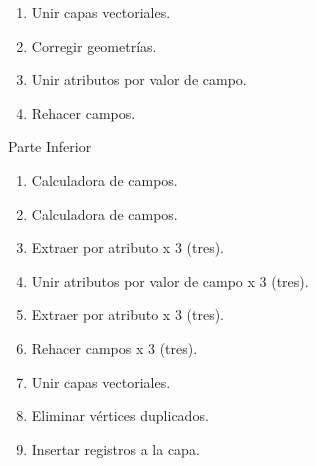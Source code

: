 \documentclass[letterpaper,10pt,spanish]{sphinxmanual}
\begin{document}
\begin{sphinxVerbatim}[commandchars=\\\{\}]
   
\end{sphinxVerbatim}
\begin{enumerate}
%
\item {} 
Unir capas vectoriales.

\item {} 
Corregir geometrías.

\item {} 
Unir atributos por valor de campo.

\item {} 
Rehacer campos.

\end{enumerate}

Parte Inferior
\begin{enumerate}
%
\item {} 
Calculadora de campos.

\item {} 
Calculadora de campos.

\item {} 
Extraer por atributo x 3 (tres).

\item {} 
Unir atributos por valor de campo x 3 (tres).

\item {} 
Extraer por atributo x 3 (tres).

\item {} 
Rehacer campos x 3 (tres).

\item {} 
Unir capas vectoriales.

\item {} 
Eliminar vértices duplicados.

\item {} 
Insertar registros a la capa.


\end{enumerate}
\end{document}
